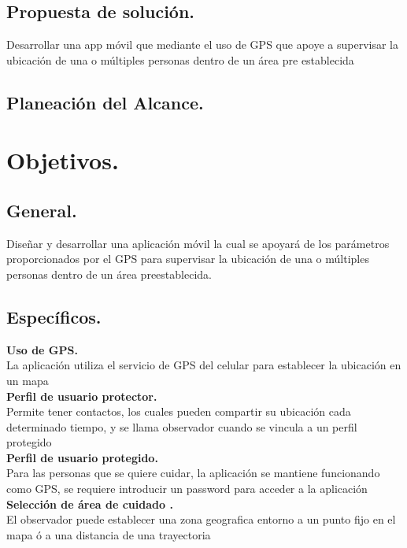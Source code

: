 \subsection{Propuesta de solución.}
Desarrollar una app móvil que mediante el uso de GPS que apoye a supervisar la ubicación de una o múltiples personas dentro de un área pre establecida  
\newpage 
\subsection{Planeación del Alcance.}
\section{Objetivos.}
\subsection{General.}
Diseñar y desarrollar una aplicación móvil la cual se apoyará de los parámetros proporcionados por el GPS para supervisar la ubicación de una o múltiples personas dentro de un  área preestablecida.
\subsection{Específicos.}

\textbf{ Uso de GPS.} \\ 

La aplicación utiliza el servicio de GPS del celular para establecer la ubicación en un mapa  \\

\textbf{ Perfil de usuario protector.}  \\

Permite tener contactos, los cuales pueden compartir su ubicación cada determinado tiempo, y se llama observador cuando se vincula a un perfil protegido \\

\textbf{ Perfil de usuario protegido.}  \\

Para las personas que se quiere cuidar, la aplicación se mantiene funcionando como GPS, se requiere introducir un password para acceder a la aplicación \\

\textbf{ Selección de área de cuidado .}  \\

El observador puede establecer una zona geografica entorno a un punto fijo en el mapa ó a una distancia de una trayectoria \\

